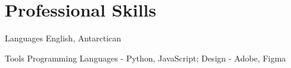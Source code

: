 \section*{Professional Skills}

\componentsimplelist
    {Languages}
    {English, Antarctican}

\componentsimplelist
    {Tools}
    {
        Programming Languages - Python, JavaScript;
        Design - Adobe, Figma
    }
